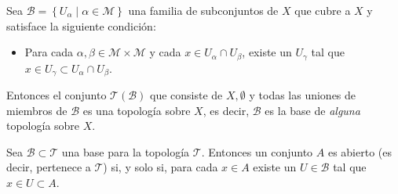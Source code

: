 \documentclass[fleqn,leqno,10pt,letterpaper,draft]{article}
\begin{document}
\begin{teo}\label{teo1}
	Sea $\mathcal{B}=\left\{ U_\alpha \mid \alpha\in \mathscr{M} \right\}$ una familia de subconjuntos de $X$
	que cubre a $X$ y satisface la siguiente condición:
	\begin{itemize}
		\item 	Para cada $\alpha,\beta\in\mathscr{M}\times\mathscr{M}$ y cada $x\in U_\alpha\cap U_\beta$,
	existe un $U_\gamma$ tal que $x\in U_\gamma\subset U_\alpha\cap U_\beta$.
	\end{itemize}
	
	Entonces el conjunto $\mathcal{T}(\mathcal{B})$ que consiste de $X,\emptyset$ y todas las uniones de miembros
	de $\mathcal{B}$ es una topología sobre $X$, es decir, $\mathcal{B}$ es la base de \emph{alguna}
	topología sobre $X$.
\end{teo}

\begin{teo}\label{teo2}
	Sea $\mathcal{B}\subset\mathcal{T}$ una base para la topología $\mathcal{T}$. Entonces un conjunto $A$
	es abierto (es decir, pertenece a $\mathcal{T}$) si, y solo si, para cada $x\in A$ existe un
	$U\in\mathcal{B}$ tal que $x\in U\subset A$.
\end{teo}

\printbibliography[
heading=bibintoc,
title={Referencias}
]
\end{document}
